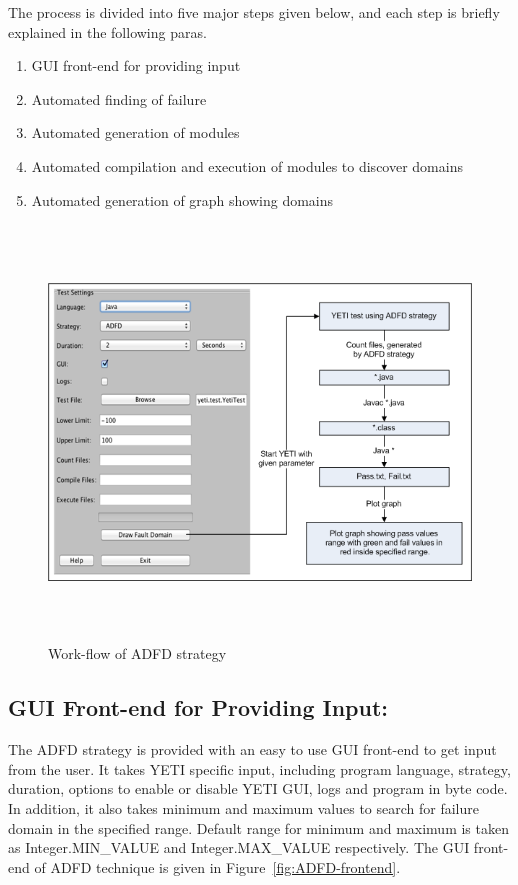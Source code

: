 The process is divided into five major steps given below, and each step is briefly explained in the following paras.

\begin{enumerate}
\item GUI front-end for providing input
\item Automated finding of failure
\item Automated generation of modules
\item Automated compilation and execution of modules to discover domains
\item Automated generation of graph showing domains
\end{enumerate}

\bigskip
\begin{figure}[ht]
\centering
\includegraphics[width=15cm,height=11cm]{chapter5/ADFD_Diagram1.png}
\bigskip
\caption{Work-flow of ADFD strategy}
\label{fig:ADFD-workflow}
\end{figure}
\bigskip

\subsection{GUI Front-end for Providing Input:}
The ADFD strategy is provided with an easy to use GUI front-end to get input from the user. It takes YETI specific input, including program language, strategy, duration, options to enable or disable YETI GUI, logs and program in byte code. In addition, it also takes minimum and maximum values to search for failure domain in the specified range. Default range for minimum and maximum is taken as Integer.MIN\_VALUE and Integer.MAX\_VALUE respectively. The GUI front-end of ADFD technique is given in Figure~\ref{fig:ADFD-frontend}.


